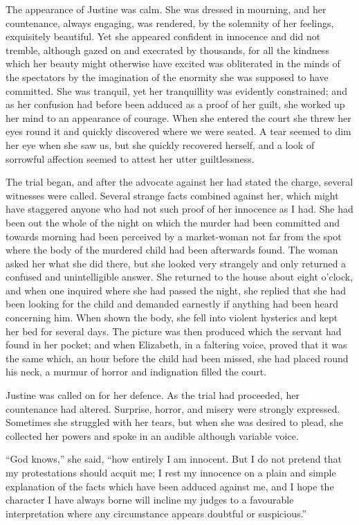 \documentclass[12pt,openright]{book}
\begin{document}
The appearance of Justine was calm. She was dressed in mourning, and her countenance, always engaging, was rendered, by the solemnity of her feelings, exquisitely beautiful. Yet she appeared confident in innocence and did not tremble, although gazed on and execrated by thousands, for all the kindness which her beauty might otherwise have excited was obliterated in the minds of the spectators by the imagination of the enormity she was supposed to have committed. She was tranquil, yet her tranquillity was evidently constrained; and as her confusion had before been adduced as a proof of her guilt, she worked up her mind to an appearance of courage. When she entered the court she threw her eyes round it and quickly discovered where we were seated. A tear seemed to dim her eye when she saw us, but she quickly recovered herself, and a look of sorrowful affection seemed to attest her utter guiltlessness.

The trial began, and after the advocate against her had stated the charge, several witnesses were called. Several strange facts combined against her, which might have staggered anyone who had not such proof of her innocence as I had. She had been out the whole of the night on which the murder had been committed and towards morning had been perceived by a market-woman not far from the spot where the body of the murdered child had been afterwards found. The woman asked her what she did there, but she looked very strangely and only returned a confused and unintelligible answer. She returned to the house about eight o’clock, and when one inquired where she had passed the night, she replied that she had been looking for the child and demanded earnestly if anything had been heard concerning him. When shown the body, she fell into violent hysterics and kept her bed for several days. The picture was then produced which the servant had found in her pocket; and when Elizabeth, in a faltering voice, proved that it was the same which, an hour before the child had been missed, she had placed round his neck, a murmur of horror and indignation filled the court.

Justine was called on for her defence. As the trial had proceeded, her countenance had altered. Surprise, horror, and misery were strongly expressed. Sometimes she struggled with her tears, but when she was desired to plead, she collected her powers and spoke in an audible although variable voice.

“God knows,” she said, “how entirely I am innocent. But I do not pretend that my protestations should acquit me; I rest my innocence on a plain and simple explanation of the facts which have been adduced against me, and I hope the character I have always borne will incline my judges to a favourable interpretation where any circumstance appears doubtful or suspicious.”
\end{document}
